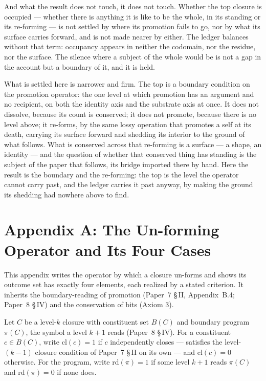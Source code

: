 \documentclass[11pt,oneside]{report}
\theoremstyle{definition}
\theoremstyle{remark}
\begin{document}
And what the result does not touch, it does not touch. Whether the top closure is occupied ---
whether there is anything it is like to be the whole, in its standing or its re-forming --- is not
settled by where its promotion fails to go, nor by what its surface carries forward, and is not made
nearer by either. The ledger balances without that term: occupancy appears in neither the codomain,
nor the residue, nor the surface. The silence where a subject of the whole would be is not a gap in
the account but a boundary of it, and it is held.

What is settled here is narrower and firm. The top is a boundary condition on the promotion
operator: the one level at which promotion has an argument and no recipient, on both the identity
axis and the substrate axis at once. It does not dissolve, because its count is conserved; it does
not promote, because there is no level above; it re-forms, by the same lossy operation that promotes
a self at its death, carrying its surface forward and shedding its interior to the ground of what
follows. What is conserved across that re-forming is a surface --- a shape, an identity --- and the
question of whether that conserved thing has standing is the subject of the paper that follows, its
bridge imported there by hand. Here the result is the boundary and the re-forming: the top is the
level the operator cannot carry past, and the ledger carries it past anyway, by making the ground
its shedding had nowhere above to find.

\section*{Appendix A: The Un-forming Operator and Its Four Cases}

This appendix writes the operator by which a closure un-forms and shows its outcome set has exactly
four elements, each realized by a stated criterion. It inherits the boundary-reading of promotion
(Paper~7 \S\,II, Appendix~B.4; Paper~8 \S\,IV) and the conservation of bits (Axiom 3).

Let \ensuremath{C} be a level-\ensuremath{k} closure with constituent set \ensuremath{B(C)} and
boundary program \ensuremath{\pi(C)}, the symbol a level \ensuremath{k{+}1} reads (Paper~8 \S\,IV).
For a constituent \ensuremath{c \in B(C)}, write \ensuremath{\mathrm{cl}(c) = 1} if \ensuremath{c}
independently closes --- satisfies the level-\ensuremath{(k{-}1)} closure condition of Paper~7 \S\,II
on its own --- and \ensuremath{\mathrm{cl}(c) = 0} otherwise. For the program, write
\ensuremath{\mathrm{rd}(\pi) = 1} if some level \ensuremath{k{+}1} reads \ensuremath{\pi(C)} and
\ensuremath{\mathrm{rd}(\pi) = 0} if none does.
\end{document}
